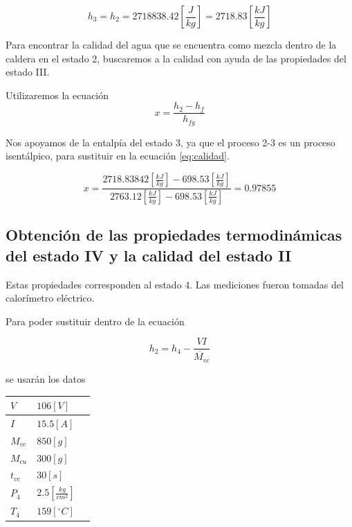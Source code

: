 \documentclass[12pt,letterpaper]{article}
\begin{document}
$$
    h_3 = h_2 = 2718838.42 \left[\frac{J}{kg}\right] = 2718.83 \left[\frac{kJ}{kg}\right]
$$

Para encontrar la calidad del agua que se encuentra como mezcla dentro de la caldera en el estado 2, 
buscaremos a la calidad con ayuda de las propiedades del estado III.

Utilizaremos la ecuación 
\begin{equation} \label{eq:calidad}
    x = \frac{h_2-h_f}{h_{fg}}
\end{equation}

Nos apoyamos de la entalpía del estado 3, ya que el proceso 2-3 es un proceso
isentálpico, para sustituir en la ecuación \ref{eq:calidad}.

$$
    x = \frac{
        2718.83842 \left[\frac{kJ}{kg}\right] - 698.53 \left[\frac{kJ}{kg}\right] }{
            2763.12 \left[\frac{kJ}{kg}\right] - 698.53 \left[\frac{kJ}{kg}\right]
        } = 0.97855
$$

\subsection{Obtención de las propiedades termodinámicas del estado IV y 
            la calidad del estado II} \label{x_calorimetro_electrico}

Estas propiedades corresponden al estado 4. Las mediciones fueron tomadas del calorímetro
eléctrico.

Para poder sustituir dentro de la ecuación

\begin{equation} \label{eq:calorimetro_electrico}
    h_2 = h_4 - \frac{VI}{ \dot{M_{vc}}}    
\end{equation}

se usarán los datos

\begin{tabularx}{0.8\textwidth} { 
  | >{\raggedright\arraybackslash}X 
  | >{\centering\arraybackslash}X 
  | >{\raggedleft\arraybackslash}X | }
 \hline
 $V$ & $106[V]$  \\
 \hline
 $I$ & $15.5[A]$  \\
 \hline
 $M_{vc}$ & $850[g]$  \\
 \hline
 $M_{cu}$ & $300[g]$  \\
 \hline
 $t_{vc}$ & $30[s]$  \\
 \hline
 $P_4$ & $2.5\left[\frac{kg}{cm^2} \right]$  \\
 \hline
 $T_4$ & $159[^\circ C]$  \\
\hline
\end{tabularx}
\end{document}
